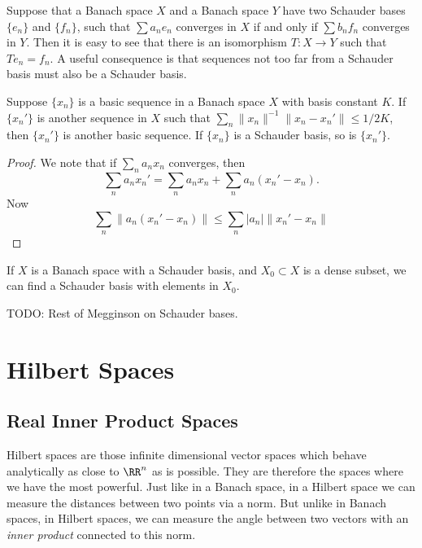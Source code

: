 Suppose that a Banach space $X$ and a Banach space $Y$ have two Schauder bases $\{ e_n \}$ and $\{ f_n \}$, such that $\sum a_n e_n$ converges in $X$ if and only if $\sum b_n f_n$ converges in $Y$. Then it is easy to see that there is an isomorphism $T: X \to Y$ such that $Te_n = f_n$. A useful consequence is that sequences not too far from a Schauder basis must also be a Schauder basis.

\begin{theorem}
    Suppose $\{ x_n \}$ is a basic sequence in a Banach space $X$ with basis constant $K$. If $\{ x_n' \}$ is another sequence in $X$ such that $\sum_n \| x_n \|^{-1} \| x_n - x_n' \| \leq 1/2K$, then $\{ x_n' \}$ is another basic sequence. If $\{ x_n \}$ is a Schauder basis, so is $\{ x_n' \}$.
\end{theorem}
\begin{proof}
    We note that if $\sum_n a_n x_n$ converges, then
    \[ \sum_n a_n x_n' = \sum_n a_n x_n + \sum_n a_n (x_n' - x_n). \]
    Now
    \[ \sum_n \| a_n (x_n' - x_n) \| \leq \sum_n |a_n| \| x_n' - x_n \| \]
\end{proof}

\begin{corollary}
    If $X$ is a Banach space with a Schauder basis, and $X_0 \subset X$ is a dense subset, we can find a Schauder basis with elements in $X_0$.
\end{corollary}

TODO: Rest of Megginson on Schauder bases.









\chapter{Hilbert Spaces}

\section{Real Inner Product Spaces}

Hilbert spaces are those infinite dimensional vector spaces which behave analytically as close to $\RR^n$ as is possible. They are therefore the spaces where we have the most powerful. Just like in a Banach space, in a Hilbert space we can measure the distances between two points via a norm. But unlike in Banach spaces, in Hilbert spaces, we can measure the angle between two vectors with an \emph{inner product} connected to this norm.

